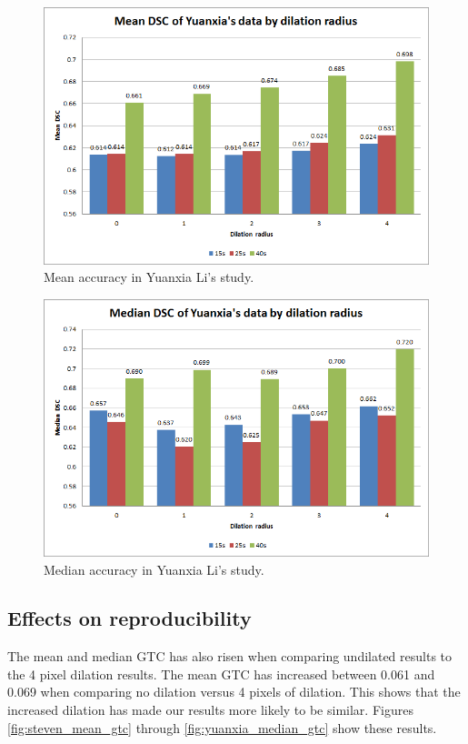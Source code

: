 \documentclass[12pt,a4paper,notitlepage]{article}
\begin{document}
\begin{figure}[H]
	\includegraphics[width=.9\linewidth]{yuanxia_mean_dsc}
	\caption{Mean accuracy in Yuanxia Li's study.}
	\label{fig:yuanxia_mean_dsc}
\end{figure}

\begin{figure}[H]
	\includegraphics[width=.9\linewidth]{yuanxia_median_dsc}
	\caption{Median accuracy in Yuanxia Li's study.}
	\label{fig:yuanxia_median_dsc}
\end{figure}

\subsection{Effects on reproducibility}
The mean and median GTC has also risen when comparing undilated results to the 4 pixel dilation results. The mean GTC has increased between 0.061 and 0.069 when comparing no dilation versus 4 pixels of dilation. This shows that the increased dilation has made our results more likely to be similar. Figures \ref{fig:steven_mean_gtc} through \ref{fig:yuanxia_median_gtc} show these results.
\end{document}
